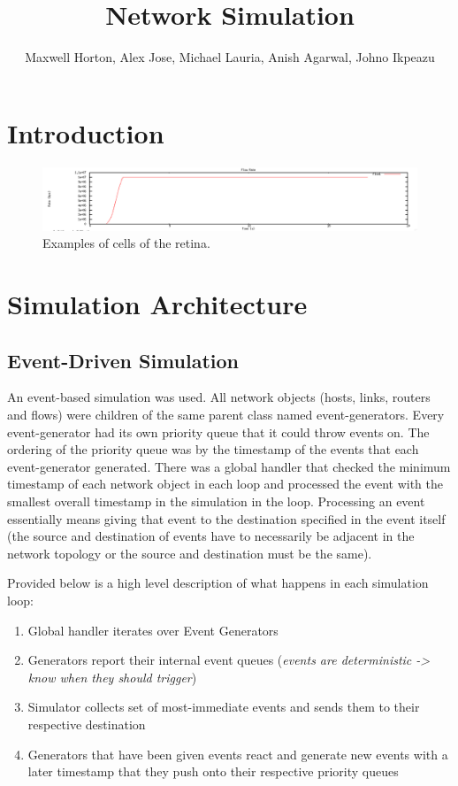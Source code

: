 \documentclass[12pt]{article}
\begin{document}
\title{Network Simulation}
\author{Maxwell Horton, Alex Jose, Michael Lauria, Anish Agarwal, Johno Ikpeazu}


\maketitle
\noindent
\tableofcontents
\newpage
\section{Introduction}

\begin{figure}[t]
\centering \includegraphics[scale=.35]{figures/Test0_Vegas/flow_rate.png}
\caption{Examples of cells of the retina.}
\label{fig:test}
\end{figure}

\section{Simulation Architecture}


\subsection{Event-Driven Simulation}
An event-based simulation was used. All network objects (hosts, links, routers and flows) were children of the same parent class named event-generators. Every event-generator had its own priority queue that it could throw events on. The ordering of the priority queue was by the timestamp of the events that each event-generator generated. There was a global handler that checked the minimum timestamp of each network object in each loop and processed the event with the smallest overall timestamp in the simulation in the loop. Processing an event essentially means giving that event to the destination specified in the event itself (the source and destination of events have to necessarily be adjacent in the network topology or the source and destination must be the same). 

Provided below is a high level description of what happens in each simulation loop:
\begin{enumerate}
\item Global handler iterates over Event Generators
\item Generators report their internal event queues (\emph{events are deterministic -> know when they should trigger})
\item Simulator collects set of most-immediate events and sends them to their respective destination
\item Generators that have been given events react and generate new events with a later timestamp that they push onto their respective priority queues
\end{enumerate}
\end{document}
